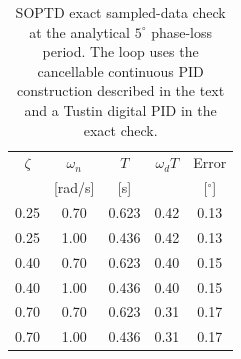 \begin{table}[htbp]
\centering
\caption{SOPTD exact sampled-data check at the analytical $5^\circ$ phase-loss
period. The loop uses the cancellable continuous PID construction described
in the text and a Tustin digital PID in the exact check.}
\label{tab:soptd-validation}
\small
\setlength{\tabcolsep}{4pt}
\begin{tabular}{@{}ccccc@{}}
\toprule
$\zeta$ & $\omega_n$ & $T$ & $\omega_dT$ & Error\\
 & [rad/s] & [s] &  & [$^\circ$]\\
\midrule
0.25 & 0.70 & 0.623 & 0.42 & 0.13\\
0.25 & 1.00 & 0.436 & 0.42 & 0.13\\
0.40 & 0.70 & 0.623 & 0.40 & 0.15\\
0.40 & 1.00 & 0.436 & 0.40 & 0.15\\
0.70 & 0.70 & 0.623 & 0.31 & 0.17\\
0.70 & 1.00 & 0.436 & 0.31 & 0.17\\
\bottomrule
\end{tabular}
\end{table}
